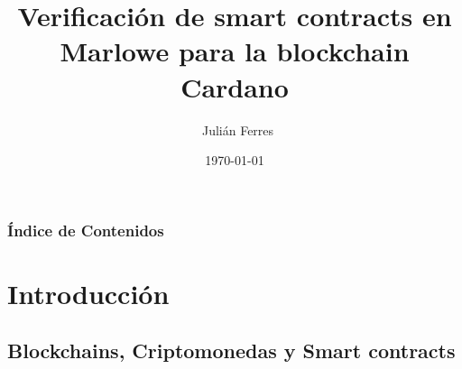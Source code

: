 \documentclass{beamer}
\title[Verificación de smart contracts en Marlowe]%
{Verificación de smart contracts en Marlowe para la blockchain Cardano}
\author[Julián Ferres] %
{~Julián Ferres}
\institute[FIUBA] %
{
  Facultad de Ingeniería\\Universidad de Buenos Aires.
}
\date{\today}
\begin{document}

\begin{frame}
	\titlepage
\end{frame}


\begin{frame} 
	\footnotesize
	\frametitle{Índice de Contenidos}
	\tableofcontents
\end{frame}

%
%
%
%
%
%
%
%

\section{Introducción}

\subsection{Blockchains, Criptomonedas y Smart contracts}
\end{document}

